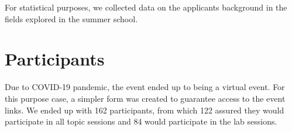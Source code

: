 For statistical purposes, we collected data on the applicants background in the fields explored in the summer school.

\section{Participants}

Due to COVID‑19 pandemic, the event ended up to being a virtual event. For this purpose case, a simpler form was created to guarantee access to the event links. We ended up with 162 participants, from which 122 assured they would participate in all topic sessions and 84 would participate in the lab sessions.
